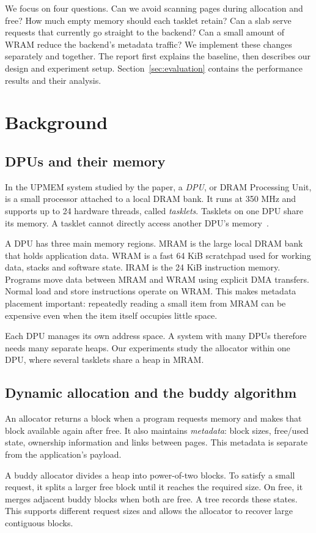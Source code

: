 \documentclass[conference]{IEEEtran}
\begin{document}
We focus on four questions. Can we avoid scanning pages during allocation and free? How much empty memory should each tasklet retain? Can a slab serve requests that currently go straight to the backend? Can a small amount of WRAM reduce the backend's metadata traffic? We implement these changes separately and together. The report first explains the baseline, then describes our design and experiment setup. Section~\ref{sec:evaluation} contains the performance results and their analysis.

\section{Background}
\subsection{DPUs and their memory}
In the UPMEM system studied by the paper, a \emph{DPU}, or DRAM Processing Unit, is a small processor attached to a local DRAM bank. It runs at 350 MHz and supports up to 24 hardware threads, called \emph{tasklets}. Tasklets on one DPU share its memory. A tasklet cannot directly access another DPU's memory~\cite{pimmalloc}.

A DPU has three main memory regions. MRAM is the large local DRAM bank that holds application data. WRAM is a fast 64 KiB scratchpad used for working data, stacks and software state. IRAM is the 24 KiB instruction memory. Programs move data between MRAM and WRAM using explicit DMA transfers. Normal load and store instructions operate on WRAM. This makes metadata placement important: repeatedly reading a small item from MRAM can be expensive even when the item itself occupies little space.

Each DPU manages its own address space. A system with many DPUs therefore needs many separate heaps. Our experiments study the allocator within one DPU, where several tasklets share a heap in MRAM.

\subsection{Dynamic allocation and the buddy algorithm}
An allocator returns a block when a program requests memory and makes that block available again after free. It also maintains \emph{metadata}: block sizes, free/used state, ownership information and links between pages. This metadata is separate from the application's payload.

A buddy allocator divides a heap into power-of-two blocks. To satisfy a small request, it splits a larger free block until it reaches the required size. On free, it merges adjacent buddy blocks when both are free. A tree records these states. This supports different request sizes and allows the allocator to recover large contiguous blocks.
\end{document}
